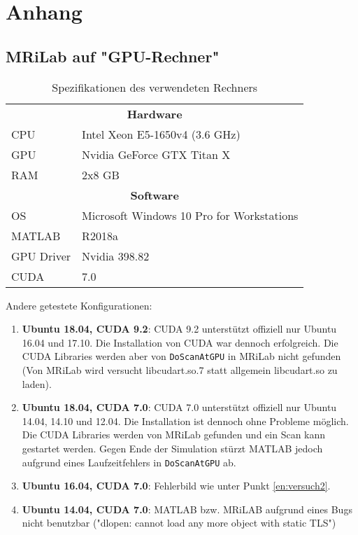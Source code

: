 \chapter{Anhang}

\section{MRiLab auf "GPU-Rechner"}%
\label{sec:usedPC}

\begin{table}[H]
	\centering
	\caption{Spezifikationen des verwendeten Rechners}
	\begin{tabular}{ll}
		\toprule
		\multicolumn{2}{c}{\textbf{Hardware}} \\
		CPU & Intel Xeon E5-1650v4 (3.6 GHz) \\
		GPU & Nvidia GeForce GTX Titan X \\
		RAM & 2x8 GB \\
		\midrule
		\multicolumn{2}{c}{\textbf{Software}} \\
		OS & Microsoft Windows 10 Pro for Workstations \\
		MATLAB & R2018a \\
		GPU Driver & Nvidia 398.82 \\
		CUDA & 7.0 \\
		\bottomrule
	\end{tabular}
\end{table}

Andere getestete Konfigurationen:
\begin{enumerate}
	\item \textbf{Ubuntu 18.04, CUDA 9.2}: CUDA 9.2 unterstützt offiziell nur Ubuntu 16.04 und 17.10. Die Installation von CUDA war dennoch erfolgreich. 
	Die CUDA Libraries werden aber von \texttt{DoScanAtGPU} in MRiLab nicht gefunden (Von MRiLab wird versucht libcudart.so.7 statt allgemein libcudart.so zu laden).
	
	\item\label{en:versuch2} \textbf{Ubuntu 18.04, CUDA 7.0}: CUDA 7.0 unterstützt offiziell nur Ubuntu 14.04, 14.10 und 12.04. Die Installation ist dennoch ohne Probleme möglich. Die CUDA Libraries werden von MRiLab gefunden und ein Scan kann gestartet werden. Gegen Ende der Simulation stürzt MATLAB jedoch aufgrund eines Laufzeitfehlers in \texttt{DoScanAtGPU} ab.
	
	\item \textbf{Ubuntu 16.04, CUDA 7.0}: Fehlerbild wie unter Punkt \ref{en:versuch2}.
	
	\item \textbf{Ubuntu 14.04, CUDA 7.0}: MATLAB bzw. MRiLAB aufgrund eines Bugs nicht benutzbar ("dlopen: cannot load any more object with static TLS")
	
	
\end{enumerate}

